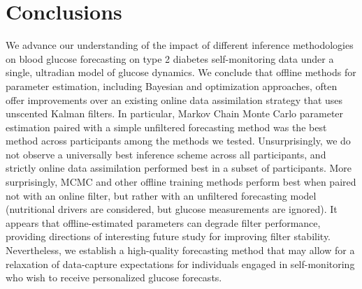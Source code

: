 \documentclass[10pt,letterpaper]{article}
\begin{document}



\section{Conclusions}
We advance our understanding of the impact of different inference methodologies on blood glucose forecasting on type 2 diabetes self-monitoring data under a single, ultradian model of glucose dynamics.
We conclude that offline methods for parameter estimation, including Bayesian and optimization approaches, often offer improvements over an existing online data assimilation strategy that uses unscented Kalman filters. In particular, Markov Chain Monte Carlo parameter estimation paired with a simple unfiltered forecasting method was the best method across participants among the methods we tested. 
Unsurprisingly, we do not observe a universally best inference scheme across all participants, and strictly online data assimilation performed best in a subset of participants. More surprisingly, MCMC and other offline training methods perform best when paired not with an online filter, but rather with an unfiltered forecasting model (nutritional drivers are considered, but glucose measurements are ignored). It appears that offline-estimated parameters can degrade filter performance,  providing directions of interesting future study for improving filter stability. Nevertheless, we establish a high-quality forecasting method that may allow for a relaxation of data-capture expectations for individuals engaged in self-monitoring who wish to receive personalized glucose forecasts.
\end{document}
